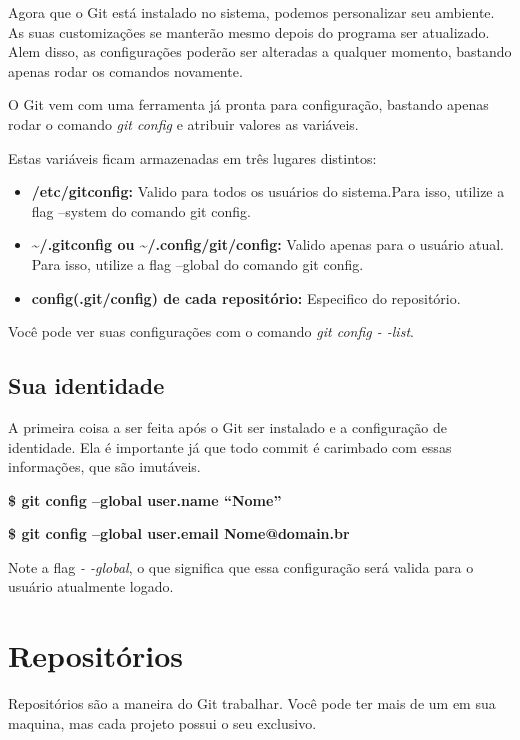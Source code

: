 \documentclass[]{article}
\begin{document}
Agora que o Git está instalado no sistema, podemos personalizar seu ambiente. 
As suas customizações se manterão mesmo depois do programa ser atualizado. 
Alem disso, as configurações poderão ser alteradas a qualquer momento, bastando apenas rodar os comandos novamente. 


O Git vem com uma ferramenta já pronta para configuração, bastando apenas rodar o comando \textit{git config} e atribuir valores as variáveis.


Estas variáveis ficam armazenadas em três lugares distintos:


\begin{itemize}
    \item {\textbf{/etc/gitconfig:} } Valido para todos os usuários do sistema.Para isso, utilize a flag --system do comando git config.
    
    \item {\textbf{\textasciitilde/.gitconfig ou \textasciitilde/.config/git/config:} } Valido apenas para o usuário atual. Para isso, utilize a flag --global do comando git config.
    
    \item {\textbf{config(.git/config) de  cada repositório:} } Especifico  do repositório.
\end{itemize}
Você pode ver suas configurações com o comando \textit{git config - -list}.

\subsection*{Sua identidade}
A primeira coisa a ser feita  após o Git ser instalado e a configuração de identidade.
 Ela é importante já que todo commit é carimbado com essas informações, que são imutáveis.

\textbf{\$ git config --global user.name ``Nome'' }

\textbf{\$ git config --global user.email Nome@domain.br}

Note a flag \textit{- -global}, o que significa que essa configuração será valida para o usuário atualmente logado.

\section{Repositórios}

Repositórios são a maneira do Git  trabalhar. Você pode ter mais de um em sua maquina, mas cada projeto possui o seu exclusivo.
\end{document}
